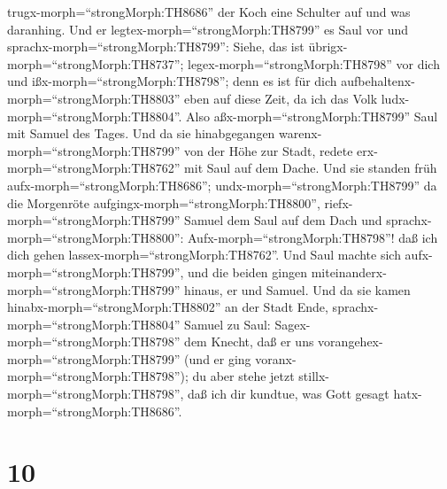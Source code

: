 trugx-morph=``strongMorph:TH8686'' der Koch eine Schulter auf und was
daranhing. Und er legtex-morph=``strongMorph:TH8799'' es Saul vor und
sprachx-morph=``strongMorph:TH8799'': Siehe, das ist
übrigx-morph=``strongMorph:TH8737''; legex-morph=``strongMorph:TH8798''
vor dich und ißx-morph=``strongMorph:TH8798''; denn es ist für dich
aufbehaltenx-morph=``strongMorph:TH8803'' eben auf diese Zeit, da ich
das Volk ludx-morph=``strongMorph:TH8804''. Also
aßx-morph=``strongMorph:TH8799'' Saul mit Samuel des Tages.
 Und da sie hinabgegangen
warenx-morph=``strongMorph:TH8799'' von der Höhe zur Stadt, redete
erx-morph=``strongMorph:TH8762'' mit Saul auf dem Dache. 
Und sie standen früh aufx-morph=``strongMorph:TH8686'';
undx-morph=``strongMorph:TH8799'' da die Morgenröte
aufgingx-morph=``strongMorph:TH8800'',
riefx-morph=``strongMorph:TH8799'' Samuel dem Saul auf dem Dach und
sprachx-morph=``strongMorph:TH8800'': Aufx-morph=``strongMorph:TH8798''!
daß ich dich gehen lassex-morph=``strongMorph:TH8762''. Und Saul machte
sich aufx-morph=``strongMorph:TH8799'', und die beiden gingen
miteinanderx-morph=``strongMorph:TH8799'' hinaus, er und Samuel.
 Und da sie kamen hinabx-morph=``strongMorph:TH8802'' an
der Stadt Ende, sprachx-morph=``strongMorph:TH8804'' Samuel zu Saul:
Sagex-morph=``strongMorph:TH8798'' dem Knecht, daß er uns
vorangehex-morph=``strongMorph:TH8799'' (und er ging
voranx-morph=``strongMorph:TH8798''); du aber stehe jetzt
stillx-morph=``strongMorph:TH8798'', daß ich dir kundtue, was Gott
gesagt hatx-morph=``strongMorph:TH8686''.

\hypertarget{section-9}{%
\section{10}\label{section-9}}

